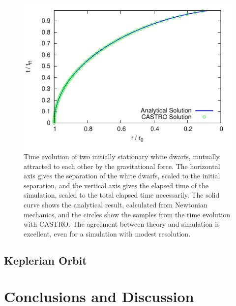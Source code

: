 \documentclass[12pt,preprint]{aastex}
\begin{document}
\begin{figure}
  \centering
  \includegraphics[scale=2.0]{freefall/plot_freefall}
  \caption{Time evolution of two initially stationary white dwarfs, mutually attracted to each other by the gravitational force. The horizontal axis gives the separation of the white dwarfs, scaled to the initial separation, and the vertical axis gives the elapsed time of the simulation, scaled to the total elapsed time necessarily. The solid curve shows the analytical result, calculated from Newtonian mechanics, and the circles show the samples from the time evolution with CASTRO. The agreement between theory and simulation is excellent, even for a simulation with modest resolution.}
  \label{Fig:Free Fall}
\end{figure}

\subsection{Keplerian Orbit}\label{Sec:Kepler}

\section{Conclusions and Discussion}\label{Sec:Conclusions and Discussion}


\acknowledgments


\clearpage

%
%
\end{document}
